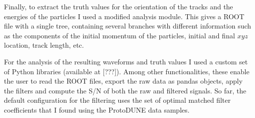 Finally, to extract the truth values for the orientation of the tracks and the energies of the particles I used a modified analysis module. This gives a ROOT file with a single tree, containing several branches with different information such as the components of the initial momentum of the particles, initial and final $xyz$ location, track length, etc.

For the analysis of the resulting waveforms and truth values I used a custom set of Python libraries (available at [???]). Among other functionalities, these enable the user to read the ROOT files, export the raw data as pandas objects, apply the filters and compute the S/N of both the raw and filtered signals. So far, the default configuration for the filtering uses the set of optimal matched filter coefficients that I found using the ProtoDUNE data samples.

